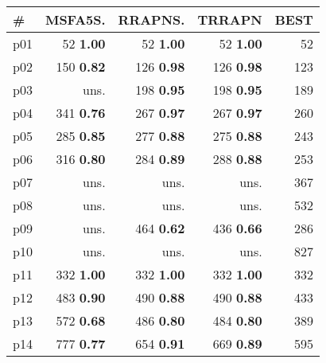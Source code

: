 \begin{tabular}{lrrrr}
\toprule
\textbf{\#} & \textbf{MSFA5S.} & \textbf{RRAPNS.} & \textbf{TRRAPN} & \textbf{BEST}\\
\midrule
\multicolumn{1}{l|}{p01} & {\footnotesize 52} \textbf{1.00} & {\footnotesize 52} \textbf{1.00} & {\footnotesize 52} \textbf{1.00} & \multicolumn{1}{|r}{52}\\
\multicolumn{1}{l|}{p02} & {\footnotesize 150} \textbf{0.82} & {\footnotesize 126} \textbf{0.98} & {\footnotesize 126} \textbf{0.98} & \multicolumn{1}{|r}{123}\\
\multicolumn{1}{l|}{p03} & uns. & {\footnotesize 198} \textbf{0.95} & {\footnotesize 198} \textbf{0.95} & \multicolumn{1}{|r}{189}\\
\multicolumn{1}{l|}{p04} & {\footnotesize 341} \textbf{0.76} & {\footnotesize 267} \textbf{0.97} & {\footnotesize 267} \textbf{0.97} & \multicolumn{1}{|r}{260}\\
\multicolumn{1}{l|}{p05} & {\footnotesize 285} \textbf{0.85} & {\footnotesize 277} \textbf{0.88} & {\footnotesize 275} \textbf{0.88} & \multicolumn{1}{|r}{243}\\
\multicolumn{1}{l|}{p06} & {\footnotesize 316} \textbf{0.80} & {\footnotesize 284} \textbf{0.89} & {\footnotesize 288} \textbf{0.88} & \multicolumn{1}{|r}{253}\\
\multicolumn{1}{l|}{p07} & uns. & uns. & uns. & \multicolumn{1}{|r}{367}\\
\multicolumn{1}{l|}{p08} & uns. & uns. & uns. & \multicolumn{1}{|r}{532}\\
\multicolumn{1}{l|}{p09} & uns. & {\footnotesize 464} \textbf{0.62} & {\footnotesize 436} \textbf{0.66} & \multicolumn{1}{|r}{286}\\
\multicolumn{1}{l|}{p10} & uns. & uns. & uns. & \multicolumn{1}{|r}{827}\\
\multicolumn{1}{l|}{p11} & {\footnotesize 332} \textbf{1.00} & {\footnotesize 332} \textbf{1.00} & {\footnotesize 332} \textbf{1.00} & \multicolumn{1}{|r}{332}\\
\multicolumn{1}{l|}{p12} & {\footnotesize 483} \textbf{0.90} & {\footnotesize 490} \textbf{0.88} & {\footnotesize 490} \textbf{0.88} & \multicolumn{1}{|r}{433}\\
\multicolumn{1}{l|}{p13} & {\footnotesize 572} \textbf{0.68} & {\footnotesize 486} \textbf{0.80} & {\footnotesize 484} \textbf{0.80} & \multicolumn{1}{|r}{389}\\
\multicolumn{1}{l|}{p14} & {\footnotesize 777} \textbf{0.77} & {\footnotesize 654} \textbf{0.91} & {\footnotesize 669} \textbf{0.89} & \multicolumn{1}{|r}{595}\\

\end{tabular}

